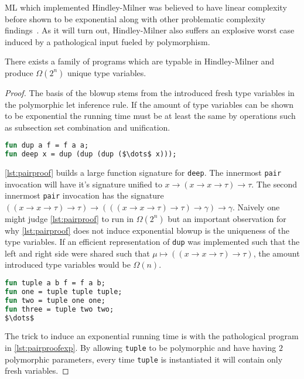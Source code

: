 \documentclass[11pt,oneside,a4paper]{report}
\begin{document}
ML which implemented Hindley-Milner was believed to have linear complexity before shown to be exponential along with other problematic complexity findings~\cite{mairson1989deciding}.
As it will turn out, Hindley-Milner also suffers an explosive worst case induced by a pathological input fueled by polymorphism.

\begin{lemma}
    There exists a family of programs which are typable in Hindley-Milner and produce $\Omega(2^n)$ unique type variables.
\end{lemma}
\begin{proof}
    The basis of the blowup stems from the introduced fresh type variables in the polymorphic let inference rule.
    If the amount of type variables can be shown to be exponential the running time must be at least the same by operations such as subsection set combination and unification.
\begin{lstlisting}[language=ML,caption={Nested pair},label={lst:pairproof},mathescape=true]
fun dup a f = f a a;
fun deep x = dup (dup (dup ($\dots$ x)));
\end{lstlisting}
    \autoref{lst:pairproof} builds a large function signature for \texttt{deep}.
    The innermost \texttt{pair} invocation will have it's signature unified to $x \rightarrow (x \rightarrow x \rightarrow \tau) \rightarrow \tau$.
    The second innermost \texttt{pair} invocation has the signature $((x \rightarrow x \rightarrow \tau) \rightarrow \tau) \rightarrow (((x \rightarrow x \rightarrow \tau) \rightarrow \tau) \rightarrow \gamma) \rightarrow \gamma$.
    Naively one might judge \autoref{lst:pairproof} to run in $\Omega(2^n)$ but an important observation for why \autoref{lst:pairproof} does not induce exponential blowup is the uniqueness of the type variables.
    If an efficient representation of \texttt{dup} was implemented such that the left and right side were shared such that $\mu \mapsto ((x \rightarrow x \rightarrow \tau) \rightarrow \tau)$, the amount introduced type variables would be $\Omega(n)$.
\begin{lstlisting}[language=ML,caption={Nested pairs with different type variables},label={lst:pairproofexp},mathescape=true]
fun tuple a b f = f a b;
fun one = tuple tuple tuple;
fun two = tuple one one;
fun three = tuple two two;
$\dots$
\end{lstlisting}
    The trick to induce an exponential running time is with the pathological program in \autoref{lst:pairproofexp}.
    By allowing \texttt{tuple} to be polymorphic and have having $2$ polymorphic parameters, every time \texttt{tuple} is instantiated it will contain only fresh variables.

\end{proof}
\end{document}
